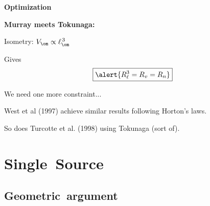   \textbf{Optimization}

  \textbf{Murray meets Tokunaga:}
    
     
      Isometry: $V_\om \propto \ell_\om^{\, 3}$
    
      Gives 
      $$\boxed{\alert{R_\ell^3 = R_v = R_n}}$$
     
      We need one more constraint...
    
      West et al (1997)\cite{west1997a} achieve similar
      results following Horton's laws.
    
      So does Turcotte et al. (1998)\cite{turcotte1998a}
      using Tokunaga (sort of).
    
  



\section{Single\ Source}

\subsection{Geometric\ argument}

